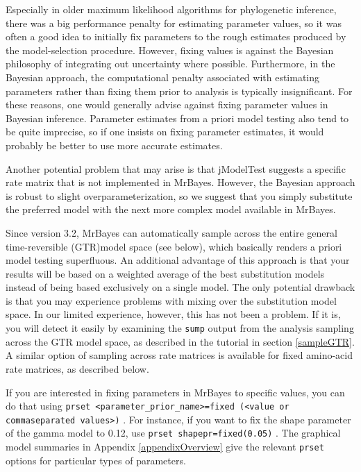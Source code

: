 \documentclass[12pt]{book}
\newcommand{\ttt}[1]{\texttt{#1} }
\begin{document}
Especially in older maximum likelihood algorithms for phylogenetic inference, there was a big
performance penalty for estimating parameter values, so it was often a good idea to initially fix
parameters to the rough estimates produced by the model-selection procedure. However, fixing values
is against the Bayesian philosophy of integrating out uncertainty where possible. Furthermore, in
the Bayesian approach, the computational penalty associated with estimating parameters rather than
fixing them prior to analysis is typically insignificant. For these reasons, one would generally
advise against fixing parameter values in Bayesian inference. Parameter estimates from a priori
model testing also tend to be quite imprecise, so if one insists on fixing parameter estimates, it
would probably be better to use more accurate estimates.

Another potential problem that may arise is that jModelTest suggests a specific rate matrix that is
not implemented in MrBayes. However, the Bayesian approach is robust to slight
overparameterization, so we suggest that you simply substitute the preferred model with the next
more complex model available in MrBayes.

Since version 3.2, MrBayes can automatically sample across the entire general time-reversible
(GTR)model space (see below), which basically renders a priori model testing superfluous. An
additional advantage of this approach is that your results will be based on a weighted average of
the best substitution models instead of being based exclusively on a single model. The only
potential drawback is that you may experience problems with mixing over the substitution model
space.  In our limited experience, however, this has not been a problem. If it is, you will detect
it easily by examining the \ttt{sump} output from the analysis sampling across the GTR model space,
as described in the tutorial in section \ref{sampleGTR}.  A similar option of sampling across rate
matrices is available for fixed amino-acid rate matrices, as described below.

If you are interested in fixing parameters in MrBayes to specific values, you can do that using
\ttt{prset <parameter\_prior\_name>=fixed (<value or commaseparated values>)}. For instance, if
you want to fix the shape parameter of the gamma model to 0.12, use \ttt{prset
shapepr=fixed(0.05)}. The graphical model summaries in Appendix \ref{appendixOverview} give the
relevant \ttt{prset} options for particular types of parameters.
\end{document}
